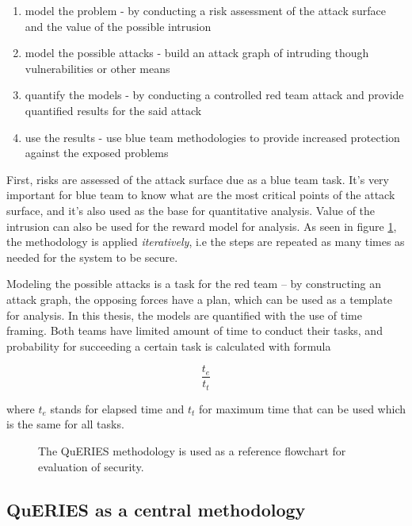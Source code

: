 \begin{enumerate}
  \item model the problem - by conducting a risk assessment of the
    attack surface and the value of the possible intrusion
  \item model the possible attacks - build an attack graph of
    intruding though vulnerabilities or other means
  \item quantify the models - by conducting a controlled red team
    attack and provide quantified results for the said attack
  \item use the results - use blue team methodologies to provide
    increased protection against the exposed problems
  
\end{enumerate}

First, risks are assessed of the attack surface due as a blue team
task. It's very important for blue team to know what are the most
critical points of the attack surface, and it's also used as the base
for quantitative analysis. Value of the intrusion can also be used for
the reward model for analysis. As seen in figure \ref{queries}, the
methodology is applied \textit{iteratively}, i.e the steps are
repeated as many times as needed for the system to be secure.

Modeling the possible attacks is a task for the red team – by
constructing an attack graph, the opposing forces have a plan, which
can be used as a template for analysis. In this thesis, the models are quantified with the use of time
framing. Both teams have limited amount of time to conduct their
tasks, and probability for succeeding a certain task is calculated
with formula

\[ \frac{t_e}{t_t} \]

where \(t_e\) stands for elapsed time and \(t_t\) for maximum time
that can be used which is the same for all tasks.

\begin{figure}[t!]
\centerline{}
\caption{The QuERIES methodology is used as a reference flowchart for
  evaluation of security. \cite{hughes2013quantitative}}
\label{queries}
\end{figure}
\subsection{QuERIES as a central methodology} \label{queriesasmethodology}

